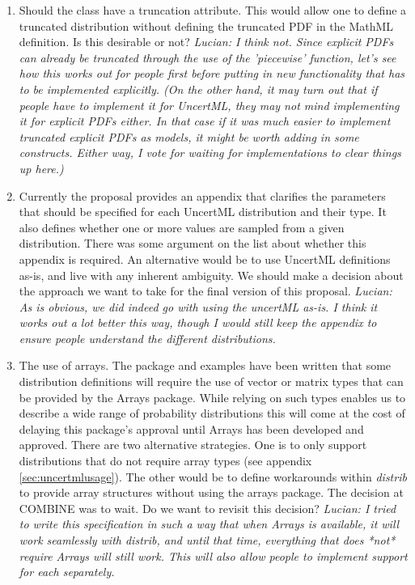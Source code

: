 \documentclass[draftspec]{sbmlpkgspec}
\newcommand{\distribshort}{\emph{distrib}\xspace}
\newcommand{\mathml}{MathML\xspace}
\newcommand{\uncertml}{UncertML\xspace}
\begin{document}
\begin{enumerate}
\item Should the  class have a truncation
  attribute. This would allow one to define a truncated distribution
  without defining the truncated PDF in the \mathml definition. Is
  this desirable or not?
  \emph{Lucian:  I think not.  Since explicit PDFs can already be truncated through the use of the 'piecewise' function, let's see how this works out for people first before putting in new functionality that has to be implemented explicitly.  (On the other hand, it may turn out that if people have to implement it for UncertML, they may not mind implementing it for explicit PDFs either.  In that case if it was much easier to implement truncated explicit PDFs as models, it might be worth adding in some constructs.  Either way, I vote for waiting for implementations to clear things up here.)}

\item Currently the proposal provides an appendix that clarifies the
  parameters that should be specified for each \uncertml distribution and their
  type. It also defines whether one or more values are sampled from a
  given distribution. There was some argument on the list about
  whether this appendix is required. An alternative would be to use
  \uncertml definitions as-is, and live with any inherent
  ambiguity. We should make a decision about the approach we want to
  take for the final version of this proposal.
  \emph{Lucian:  As is obvious, we did indeed go with using the uncertML as-is.  I think it works out a lot better this way, though I would still keep the appendix to ensure people understand the different distributions.}

\item The use of arrays. The package and examples have been written
  that some distribution definitions will require the use of vector or
  matrix types that can be provided by the Arrays package. While
  relying on such types enables us to describe a wide range of
  probability distributions this will come at the cost of delaying
  this package's approval until Arrays has been developed and
  approved. There are two alternative strategies. One is to only
  support distributions that do not require array types (see appendix
  \ref{sec:uncertmlusage}). The other would be to define workarounds
  within \distribshort to provide array structures without using the
  arrays package. The decision at COMBINE was to wait. Do we want to
  revisit this decision?
  \emph{Lucian:  I tried to write this specification in such a way that when Arrays is available, it will work seamlessly with distrib, and until that time, everything that does *not* require Arrays will still work.  This will also allow people to implement support for each separately.}


\end{enumerate}
\end{document}
